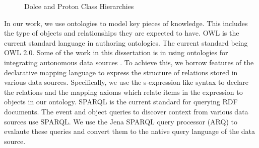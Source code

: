 \begin{figure}[ht]
\begin{minipage}[b]{0.45\linewidth}
\end{minipage}
\caption{Dolce and Proton Class Hierarchies}
\label{fig:ontology-hierarchies}
\end{figure}

In our work, we use ontologies to model key pieces of knowledge. This includes the type of objects and relationships they are expected to have. OWL is the current standard language in authoring ontologies. The current standard being OWL 2.0. Some of the work in this dissertation is in using ontologies for integrating autonomous data sources \cite{smith2007obo, noy2004semantic, astakhov2005data}. To achieve this, we borrow  features of the declarative mapping language \cite{dou2005ontology} to express the structure of relations stored in various data sources. Specifically, we use the s-expression like syntax to declare the relations and the mapping axioms which relate items in the expression to objects in our ontology. SPARQL \cite{prud2008sparql} is the current standard for querying RDF documents. The event and object queries to discover context from various data sources use SPARQL. We use the Jena \cite{carroll2004jena} SPARQL query processor (ARQ) to evalaute these queries and convert them to the native query language of the data source.

